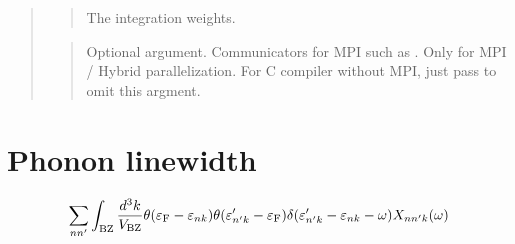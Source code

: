 \documentclass[letterpaper,10pt,pdftex,openany,english]{sphinxmanual}
\begin{document}
\begin{quote}
\begin{quote}
\sphinxAtStartPar
The integration weights.
\end{quote}

\begin{sphinxVerbatim}[commandchars=\\\{\}]
\end{sphinxVerbatim}
\begin{quote}

\sphinxAtStartPar
Optional argument. Communicators for MPI such as .
Only for MPI / Hybrid parallelization.
For C compiler without MPI, just pass  to omit this argment.
\end{quote}
\end{quote}


\section{Phonon linewidth}
\label{\detokenize{routine:phonon-linewidth}}\begin{equation*}
\begin{split}\begin{align}
\sum_{n n'}
\int_{\rm BZ} \frac{d^3 k}{V_{\rm BZ}}
\theta(\varepsilon_{\rm F} -
\varepsilon_{n k}) \theta(\varepsilon'_{n' k} - \varepsilon_{\rm F})
\delta(\varepsilon'_{n' k} - \varepsilon_{n k} - \omega)
X_{n n' k}(\omega)
\end{align}\end{split}
\end{equation*}
\begin{sphinxVerbatim}[commandchars=\\\{\}]
\end{sphinxVerbatim}
\end{document}
